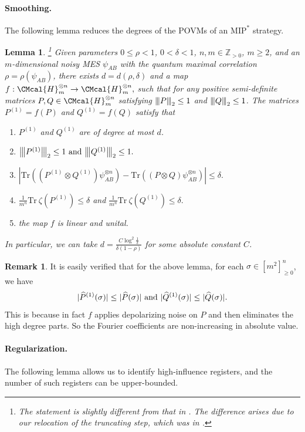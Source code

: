 \documentclass[10pt,a4paper]{article}
\def\H{\CMcal{H}}
\theoremstyle{plain}
\newtheorem{lemma}[theorem]{Lemma}
\theoremstyle{definition}
\newtheorem{remark}[theorem]{Remark}
\newcommand {\br} [1] {\ensuremath{ \left( #1 \right) }}
\newcommand {\ab} [1] {\ensuremath{ \left| #1 \right| }}
\DeclarePairedDelimiter{\abs}{\lvert}{\rvert}
\newcommand{\nnorm}[1]{{\left\vert\kern-0.25ex\left\vert\kern-0.25ex\left\vert #1
		\right\vert\kern-0.25ex\right\vert\kern-0.25ex\right\vert}}
\newcommand {\Tr} {\ensuremath{ \mathrm{Tr} }}
\newcommand{\posint}{{\mathbb Z}_{>0}}
\newcommand{\1}{\mathbb{1}} %
\newcommand{\MIP}{\mathrm{MIP}}
\begin{document}
\paragraph*{Smoothing.} The following lemma reduces the degrees of the POVMs of an $\MIP^\ast$ strategy.
\begin{lemma}\label{lem:smoothing of strategies}\cite[Lemma 6.1]{qin2021nonlocal}\footnote{The statement is slightly different from that in \cite[Lemma 6.1]{qin2021nonlocal}. The difference arises due to our relocation of the truncating step, which was in \cite[Lemma 10.5]{qin2021nonlocal}.}
	Given parameters $0\leq\rho<1$, $0<\delta<1$, $n,m\in\posint$, $m\geq2$, and an $m$-dimensional noisy MES $\psi_{AB}$  with the quantum maximal correlation $\rho=\rho\br{\psi_{AB}}$, there exists $d=d\br{\rho,\delta}$ and a map $f:\H_m^{\otimes n}\rightarrow \H_m^{\otimes n},$ such that for any positive semi-definite matrices $P, Q\in\H_m^{\otimes n}$ satisfying $\nnorm{P}_2\leq1$ and $\nnorm{Q}_2\leq1$. The matrices $P^{(1)}=f\br{P}$ and $Q^{(1)}=f\br{Q}$ satisfy that		
		\begin{enumerate}
						\item $P^{(1)}$ and $Q^{(1)}$ are of degree at most $d$.
			\item $\nnorm{P^{(1)}}_2\leq1~\mbox{and}~\nnorm{Q^{(1)}}_2\leq1.$

			\item $\ab{\Tr\br{\br{P^{(1)}\otimes Q^{(1)}}\psi^{\otimes n}_{AB}}-\Tr\br{\br{P\otimes Q}\psi^{\otimes n}_{AB}}}\leq\delta.$
		\item $\frac{1}{m^n}\Tr~\zeta(P^{(1)})\leq\delta $ and $\frac{1}{m^n}\Tr~\zeta(Q^{(1)})\leq\delta. $
            \item the map $f$ is linear and unital.
		\end{enumerate}
		In particular, we can take $d=\frac{C\log^2\frac{1}{\delta}}{\delta(1-\rho)}$ for some absolute constant $C$.
\end{lemma}
\begin{remark}
  It is easily verified that for the above lemma,
  for each $\sigma\in[m^2]^n_{\ge0}$, we have
  $$\abs{\widehat{P}^{(1)}(\sigma)}\le\abs{\widehat{P}(\sigma)}~\mbox{and}~\abs{\widehat{Q}^{(1)}(\sigma)}\le\abs{\widehat{Q}(\sigma)}.$$
  This is because in fact $f$ applies depolarizing noise on $P$ and then eliminates the high degree parts. So the Fourier coefficients are non-increasing in absolute value.
\end{remark}

\paragraph*{Regularization.} The following lemma allows us to identify high-influence registers,
and the number of such registers can be upper-bounded.
\end{document}
